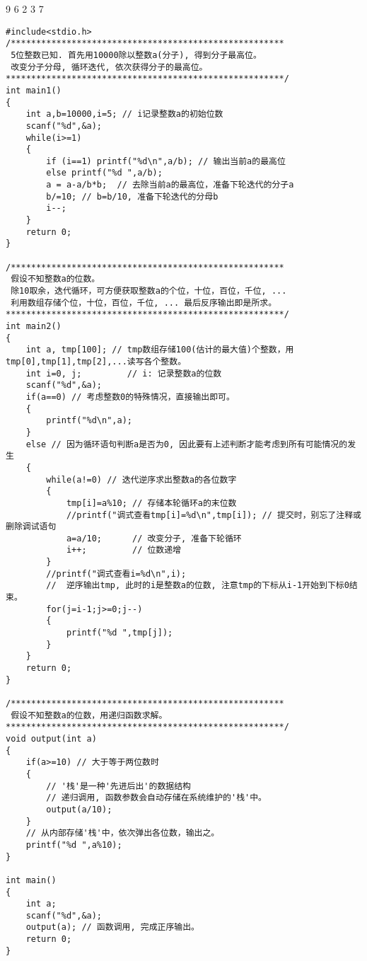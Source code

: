 9 6 2 3 7
\newpage
\begin{lstlisting}
#include<stdio.h> 
/******************************************************
 5位整数已知. 首先用10000除以整数a(分子), 得到分子最高位。 
 改变分子分母, 循环迭代, 依次获得分子的最高位。
*******************************************************/        
int main1()              
{  
	int a,b=10000,i=5; // i记录整数a的初始位数
	scanf("%d",&a);
	while(i>=1)
	{
		if (i==1) printf("%d\n",a/b); // 输出当前a的最高位
		else printf("%d ",a/b);
		a = a-a/b*b;  // 去除当前a的最高位，准备下轮迭代的分子a
		b/=10; // b=b/10, 准备下轮迭代的分母b
		i--;
	} 
	return 0;           
}  
             
/******************************************************
 假设不知整数a的位数。
 除10取余，迭代循环，可方便获取整数a的个位，十位，百位，千位, ... 
 利用数组存储个位，十位，百位，千位, ... 最后反序输出即是所求。 
*******************************************************/        
int main2()              
{  
	int a, tmp[100]; // tmp数组存储100(估计的最大值)个整数，用tmp[0],tmp[1],tmp[2],...读写各个整数。
	int i=0, j;         // i: 记录整数a的位数 
	scanf("%d",&a);
	if(a==0) // 考虑整数0的特殊情况，直接输出即可。
	{
		printf("%d\n",a); 
	}
	else // 因为循环语句判断a是否为0, 因此要有上述判断才能考虑到所有可能情况的发生 
	{
		while(a!=0) // 迭代逆序求出整数a的各位数字 
		{
			tmp[i]=a%10; // 存储本轮循环a的末位数
			//printf("调式查看tmp[i]=%d\n",tmp[i]); // 提交时，别忘了注释或删除调试语句 
			a=a/10;      // 改变分子, 准备下轮循环
			i++;         // 位数递增 
		}
		//printf("调式查看i=%d\n",i); 
		//  逆序输出tmp, 此时的i是整数a的位数, 注意tmp的下标从i-1开始到下标0结束。 
		for(j=i-1;j>=0;j--)
		{
			printf("%d ",tmp[j]);
		} 
	}
	return 0;           
}    

/******************************************************
 假设不知整数a的位数，用递归函数求解。
*******************************************************/    
void output(int a)              
{  
	if(a>=10) // 大于等于两位数时
	{
		// '栈'是一种'先进后出'的数据结构
		// 递归调用, 函数参数会自动存储在系统维护的'栈'中。 
		output(a/10); 
	} 
	// 从内部存储'栈'中，依次弹出各位数，输出之。
	printf("%d ",a%10);   
} 

int main()
{
	int a;
	scanf("%d",&a);
	output(a); // 函数调用, 完成正序输出。  
	return 0; 
}
\end{lstlisting}

